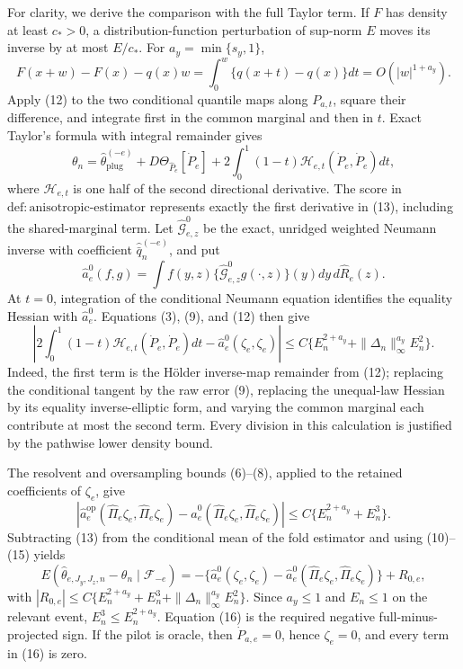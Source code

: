 For clarity, we derive the comparison with the full Taylor term.  If \(F\) has density at least \(c_* >0\), a distribution-function perturbation of sup-norm \(E\) moves its inverse by at most \(E/c_*\). For \(a_y=\min\{s_y,1\}\),
\[
F(x+w)-F(x)-q(x)w
=\int_0^w\{q(x+t)-q(x)\}dt=O(|w|^{1+a_y}).                     \tag{12}
\]
Apply (12) to the two conditional quantile maps along \(P_{a,t}\), square their difference, and integrate first in the common marginal and then in \(t\). Exact Taylor's formula with integral remainder gives
\[
\theta_n=\widehat\theta_{\mathrm{plug}}^{(-e)}
+D\Theta_{\widehat P_e}[\dot P_e]
+2\int_0^1(1-t)\mathcal H_{e,t}(\dot P_e,\dot P_e)dt,           \tag{13}
\]
where \(\mathcal H_{e,t}\) is one half of the second directional derivative. The score in \(\mathrm{def{:}anisotropic\text{-}estimator}\) represents exactly the first derivative in (13), including the shared-marginal term. Let \(\widehat{\mathcal G}^{0}_{e,z}\) be the exact, unridged weighted Neumann inverse with coefficient \(\widehat{\bar q}_n^{(-e)}\), and put
\[
\widehat a_e^0(f,g)=\int f(y,z)\{\widehat{\mathcal G}^{0}_{e,z}g(\cdot,z)\}(y)dy\,d\widehat R_e(z).
\]
At \(t=0\), integration of the conditional Neumann equation identifies the equality Hessian with \(\widehat a_e^0\). Equations (3), (9), and (12) then give
\[
\left|2\int_0^1(1-t)\mathcal H_{e,t}(\dot P_e,\dot P_e)dt
-\widehat a_e^0(\zeta_e,\zeta_e)\right|
\le C\{E_n^{2+a_y}+\|\Delta_n\|_\infty^{a_y}E_n^2\}.          \tag{14}
\]
Indeed, the first term is the H\"older inverse-map remainder from (12); replacing the conditional tangent by the raw error (9), replacing the unequal-law Hessian by its equality inverse-elliptic form, and varying the common marginal each contribute at most the second term. Every division in this calculation is justified by the pathwise lower density bound.

The resolvent and oversampling bounds (6)--(8), applied to the retained coefficients of \(\zeta_e\), give
\[
\left|\widehat a_e^{\mathrm{op}}(\widehat\Pi_e\zeta_e,\widehat\Pi_e\zeta_e)
-\widehat a_e^0(\widehat\Pi_e\zeta_e,\widehat\Pi_e\zeta_e)\right|
\le C\{E_n^{2+a_y}+E_n^3\}.                                    \tag{15}
\]
Subtracting (13) from the conditional mean of the fold estimator and using (10)--(15) yields
\[
E(\widehat\theta_{e,J_y,J_z,n}-\theta_n\mid\mathscr F_{-e})
=-\{\widehat a_e^0(\zeta_e,\zeta_e)
-\widehat a_e^0(\widehat\Pi_e\zeta_e,\widehat\Pi_e\zeta_e)\}
+R_{0,e},                                                        \tag{16}
\]
with \(|R_{0,e}|\le C\{E_n^{2+a_y}+E_n^3+\|\Delta_n\|_\infty^{a_y}E_n^2\}\). Since \(a_y\le1\) and \(E_n\le1\) on the relevant event, \(E_n^3\le E_n^{2+a_y}\). Equation (16) is the required negative full-minus-projected sign. If the pilot is oracle, then \(\dot P_{a,e}=0\), hence \(\zeta_e=0\), and every term in (16) is zero.

